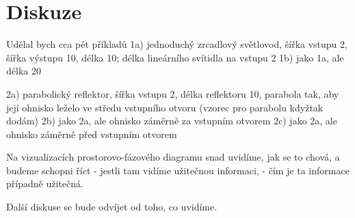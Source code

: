 \chapter{Diskuze}

Udělal bych cca pět příkladů
1a) jednoduchý zrcadlový světlovod, šířka vstupu 2, šířka výstupu 10,
délka 10; délka lineárního svítidla na vstupu 2
1b) jako 1a, ale délka 20

2a) parabolický reflektor, šířka vstupu 2, délka reflektoru 10, parabola
tak, aby její ohnisko leželo ve středu vstupního otvoru (vzorec pro
parabolu kdyžtak dodám)
2b) jako 2a, ale ohnisko záměrně za vstupním otvorem
2c) jako 2a, ale ohnisko záměrně před vstupním otvorem

Na vizualizacích prostorovo-fázového diagramu snad uvidíme, jak se to
chová, a budeme schopni říct
- jestli tam vidíme užitečnou informaci,
- čím je ta informace případně užitečná.

Další diskuse se bude odvíjet od toho, co uvidíme.
